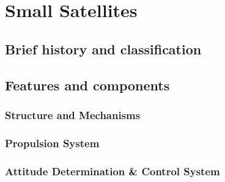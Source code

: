 %
%
%


\chapter{Small Satellites}
\label{chp:SmallSat}

\section{Brief history and classification}
\label{sec:SmallSat_HistoryClass}

{\small\textit{\lipsum[1-2]}}


\section{Features and components}
\label{sec:SmallSat_FeaturesComponents}

{\small\textit{\lipsum[1-2]}}

\subsection{Structure and Mechanisms}
\label{subsec:Structures}

{\small\textit{\lipsum[1-2]}}

\subsection{Propulsion System}
\label{subsec:Propulsion}

{\small\textit{\lipsum[1-2]}}

\subsection{Attitude Determination \& Control System}
\label{subsec:ADCS}

